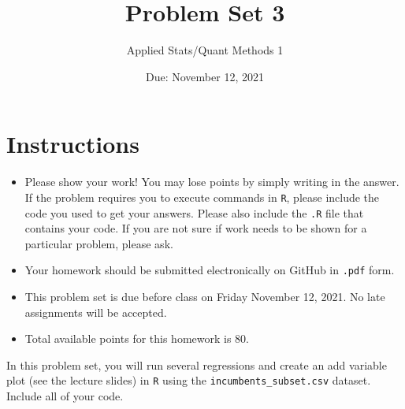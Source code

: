 \documentclass[12pt,letterpaper]{article}
\title{Problem Set 3}
\date{Due: November 12, 2021}
\author{Applied Stats/Quant Methods 1}
\begin{document}
	\maketitle
	\section*{Instructions}
	\begin{itemize}
		\item Please show your work! You may lose points by simply writing in the answer. If the problem requires you to execute commands in \texttt{R}, please include the code you used to get your answers. Please also include the \texttt{.R} file that contains your code. If you are not sure if work needs to be shown for a particular problem, please ask.
		\item Your homework should be submitted electronically on GitHub in \texttt{.pdf} form.
		\item This problem set is due before class on Friday November 12, 2021. No late assignments will be accepted.
		\item Total available points for this homework is 80.
	\end{itemize}
		
	
	\vspace{.25cm}
	
	\noindent In this problem set, you will run several regressions and create an add variable plot (see the lecture slides) in \texttt{R} using the \texttt{incumbents\_subset.csv} dataset. Include all of your code.
	
	\vspace{.5cm}
\end{document}

